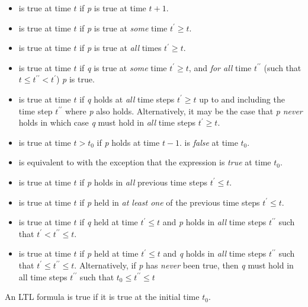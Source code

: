 \begin{itemize}
  \item {}
        is true at time $t$ if \textit{p} is true at time $t+1$.
  \item {}
        is true at time $t$ if \textit{p} is true at \emph{some} time
        $t^\prime \ge t$.
  \item {}
        is true at time $t$ if \textit{p} is true at \emph{all} times
        $t^\prime \ge t$.
  \item {}
        is true at time $t$ if \textit{q} is true at \emph{some} time
        $t^\prime \ge t$, and \emph{for all} time $t^{\prime\prime}$
        (such that $t \le t^{\prime\prime} < t^\prime$) \textit{p} is
        true.
  \item {}
        is true at time $t$ if \textit{q} holds at \emph{all} time steps $t^\prime
        \geq t$ up to and including the time step $t^{\prime\prime}$
        where \textit{p} also holds. Alternatively, it may be the case that \textit{p}
        \emph{never} holds in which case \textit{q} must hold in \emph{all} time
        steps $t^\prime \geq t$.
  \item {} is true at time $t > t_0$ if \textit{p} holds
        at time $t - 1$.  is \emph{false} at time $t_0$.
  \item {} is equivalent to 
        with the exception that the expression is \emph{true} at time $t_0$.
  \item {} is true at time $t$ if \textit{p} holds in \emph{all}
        previous time steps $t^\prime \leq t$.
  \item {} is true at time $t$ if \textit{p} held in \emph{at least one}
        of the previous time steps $t^\prime \leq t$.
  \item {} is true at time $t$ if \textit{q} held at time
        $t^\prime \leq t$ and \textit{p} holds in \emph{all} time steps $t^{\prime\prime}$ such
        that $t^\prime < t^{\prime\prime} \le t$.
  \item {} is true at time $t$ if \textit{p} held at time
        $t^\prime \leq t$ and \textit{q} holds in \emph{all} time steps $t^{\prime\prime}$ such
        that $t^\prime \le t^{\prime\prime} \le t$. Alternatively, if \textit{p} has \emph{never}
        been true, then \textit{q} must hold in all time steps $t^{\prime\prime}$ such
        that $t_0 \le t^{\prime\prime} \le t$
\end{itemize}
An LTL formula is true if it is true at the initial time $t_0$.


